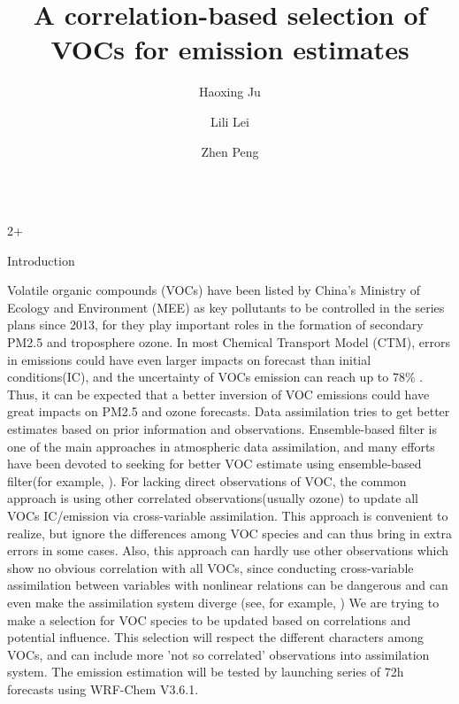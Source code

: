 \documentclass[final]{beamer}
\title{A correlation-based selection of VOCs for emission estimates}
\author{Haoxing Ju \inst{1} \and Lili Lei \inst{1} \and Zhen Peng \inst{1}}
\institute[shortinst]{\inst{1} Nanjing University}
\newlength{\sepwidth}
\newlength{\colwidth}
\begin{document}
\begin{frame}[t]
	\begin{columns}
    	\begin{column}{2\colwidth+\sepwidth}
    	\begin{block}{Introduction}
    		
            Volatile organic compounds (VOCs) have been listed by China's Ministry of Ecology and Environment (MEE) as key pollutants to be controlled in the series plans since 2013, for they play important roles in 
            the formation of secondary PM2.5 and troposphere ozone. In most Chemical Transport Model (CTM), errors in emissions could have even larger impacts on forecast than initial conditions(IC)\parencite{Sandu_2011}, and the uncertainty of VOCs emission can reach up to 78\% \parencite{Li_2017}. Thus, it can be expected that a better inversion of VOC emissions could have great impacts on PM2.5 and ozone forecasts.
            \newline
            Data assimilation tries to get better estimates based on prior information and observations. Ensemble-based filter is one of the main approaches in atmospheric data assimilation, and many efforts have been devoted to seeking for better VOC estimate using ensemble-based filter(for example, \parencite{Tang_2011, Ma_2019, Xing_2020}). For lacking direct observations of VOC, the common approach is using other correlated observations(usually ozone) to update all VOCs IC/emission via cross-variable assimilation. This approach is convenient to realize, but ignore the differences among VOC species and can thus bring in extra errors in some cases. Also, this approach can hardly use other observations which show no obvious correlation with all VOCs, since conducting cross-variable assimilation between variables with nonlinear relations can be dangerous and can even make the assimilation system diverge (see, for example, \parencite{Tang_2016})
            \newline
            We are trying to make a selection for VOC species to be updated based on correlations and potential influence. This selection will respect the different characters among VOCs, and can include more 'not so correlated' observations into assimilation system. The emission estimation will be tested by launching series of 72h forecasts using WRF-Chem V3.6.1.
    		
    		
    	\end{block}
    	\end{column}


\end{columns}
\end{frame}
\end{document}
